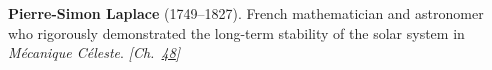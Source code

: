 \textbf{Pierre-Simon Laplace} (1749–1827). French mathematician and astronomer who rigorously demonstrated the long-term stability of the solar system in \emph{M\'{e}canique C\'{e}leste}. \emph{[Ch.~\hyperref[ch:threebody]{48}]}

